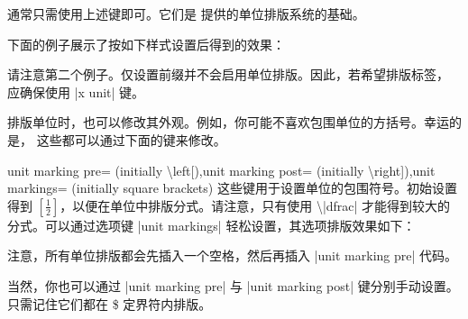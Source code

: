 通常只需使用上述键即可。它们是 \PGFPlots{} 提供的单位排版系统的基础。
%
\begin{codeexample}[]
\end{codeexample}

下面的例子展示了按如下样式设置后得到的效果：
%
\begin{codeexample}[code only]
\pgfplotsset{use units,x unit=T,xlabel=Temperature,ylabel=Nothing}
\pgfplotsset{use units,x unit prefix=m,xlabel=Temperature,ylabel=Nothing}
\end{codeexample}
%
请注意第二个例子。仅设置前缀并不会启用单位排版。因此，若希望排版标签，
应确保使用 |x unit| 键。

排版单位时，也可以修改其外观。例如，你可能不喜欢包围单位的方括号。幸运的是，
这些都可以通过下面的键来修改。

\begin{pgfplotskeylist}{unit marking pre= (initially \textbackslash left[),unit marking post= (initially \textbackslash right]),unit markings= (initially square brackets)}
    这些键用于设置单位的包围符号。初始设置得到
    $\left[\frac{1}{2}\right]$，以便在单位中排版分式。请注意，只有使用
    \textbackslash|dfrac| 才能得到较大的分式。可以通过选项键 |unit markings|
    轻松设置，其选项排版效果如下：
\begin{codeexample}
\pgfplotsset{x unit=T,unit markings=parenthesis} %
\pgfplotsset{x unit=T,unit markings=square brackets} %
\pgfplotsset{x unit=T,unit markings=slash space} %
\end{codeexample}
    注意，所有单位排版都会先插入一个空格，然后再插入 |unit marking pre| 代码。

    当然，你也可以通过 |unit marking pre| 与 |unit marking post| 键分别手动设置。
    只需记住它们都在 \$ 定界符内排版。
\end{pgfplotskeylist}

